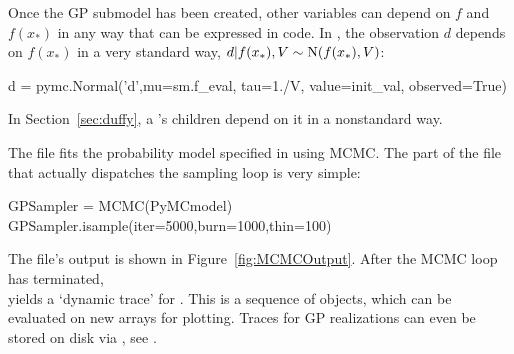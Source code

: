 \documentclass[article]{jss}
\begin{document}
Once the GP submodel has been created, other variables can depend on $f$ and $f(x_*)$ in any way that can be expressed in  code. In , the observation $d$ depends on $f(x_*)$ in a very standard way, $d|f(x_*),V\sim \textup{N}(f(x_*),V)$: 
\begin{CodeChunk}
\begin{CodeInput}
d = pymc.Normal('d',mu=sm.f_eval, tau=1./V, value=init_val, observed=True)
\end{CodeInput}
\end{CodeChunk}
In Section~\ref{sec:duffy}, a 's children depend on it in a nonstandard way. 


The file  fits the probability model specified in  using MCMC. The part of the file that actually dispatches the sampling loop is very simple:
\begin{CodeChunk}
\begin{CodeInput}
GPSampler = MCMC(PyMCmodel)
GPSampler.isample(iter=5000,burn=1000,thin=100)    
\end{CodeInput}
\end{CodeChunk}
The file's output is shown in Figure~\ref{fig:MCMCOutput}. After the MCMC loop has terminated, \\ yields a `dynamic trace' for . This is a sequence of  objects, which can be evaluated on new arrays for plotting. Traces for GP realizations can even be stored on disk via  \citep{tables}, see \cite{pymc}.

\end{document}
